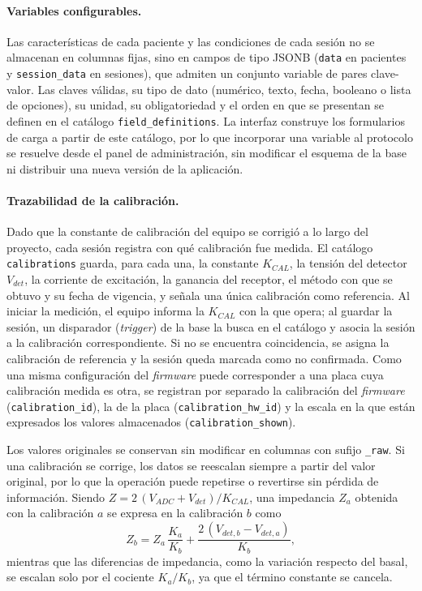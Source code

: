 \documentclass[12pt,a4paper]{article}
\begin{document}
\paragraph{Variables configurables.} Las características de cada paciente y las condiciones de cada sesión no se almacenan en columnas fijas, sino en campos de tipo JSONB (\texttt{data} en pacientes y \texttt{session\_data} en sesiones), que admiten un conjunto variable de pares clave-valor. Las claves válidas, su tipo de dato (numérico, texto, fecha, booleano o lista de opciones), su unidad, su obligatoriedad y el orden en que se presentan se definen en el catálogo \texttt{field\_definitions}. La interfaz construye los formularios de carga a partir de este catálogo, por lo que incorporar una variable al protocolo se resuelve desde el panel de administración, sin modificar el esquema de la base ni distribuir una nueva versión de la aplicación.

\paragraph{Trazabilidad de la calibración.} Dado que la constante de calibración del equipo se corrigió a lo largo del proyecto, cada sesión registra con qué calibración fue medida. El catálogo \texttt{calibrations} guarda, para cada una, la constante $K_{CAL}$, la tensión del detector $V_{det}$, la corriente de excitación, la ganancia del receptor, el método con que se obtuvo y su fecha de vigencia, y señala una única calibración como referencia. Al iniciar la medición, el equipo informa la $K_{CAL}$ con la que opera; al guardar la sesión, un disparador (\textit{trigger}) de la base la busca en el catálogo y asocia la sesión a la calibración correspondiente. Si no se encuentra coincidencia, se asigna la calibración de referencia y la sesión queda marcada como no confirmada. Como una misma configuración del \textit{firmware} puede corresponder a una placa cuya calibración medida es otra, se registran por separado la calibración del \textit{firmware} (\texttt{calibration\_id}), la de la placa (\texttt{calibration\_hw\_id}) y la escala en la que están expresados los valores almacenados (\texttt{calibration\_shown}). 

Los valores originales se conservan sin modificar en columnas con sufijo \texttt{\_raw}. Si una calibración se corrige, los datos se reescalan siempre a partir del valor original, por lo que la operación puede repetirse o revertirse sin pérdida de información. Siendo $Z = 2\,(V_{ADC} + V_{det})/K_{CAL}$, una impedancia $Z_a$ obtenida con la calibración $a$ se expresa en la calibración $b$ como
\begin{equation}
    Z_b = Z_a\,\frac{K_a}{K_b} + \frac{2\,(V_{det,b} - V_{det,a})}{K_b},
    \label{eq:reescalado}
\end{equation}
mientras que las diferencias de impedancia, como la variación respecto del basal, se escalan solo por el cociente $K_a/K_b$, ya que el término constante se cancela.
\end{document}

